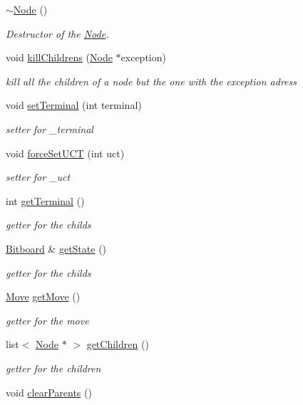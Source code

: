 \begin{DoxyCompactItemize}
\item 
\hyperlink{classmcts_1_1_node_acc91ea418dba8fa979b276e7d0a3af58}{$\sim$\+Node} ()
\begin{DoxyCompactList}\small\item\em Destructor of the \hyperlink{classmcts_1_1_node}{Node}. \end{DoxyCompactList}\item 
void \hyperlink{classmcts_1_1_node_ac01b59cb23a9cbbf0ccd710f42ac5c71}{kill\+Childrens} (\hyperlink{classmcts_1_1_node}{Node} $\ast$exception)
\begin{DoxyCompactList}\small\item\em kill all the children of a node but the one with the exception adress \end{DoxyCompactList}\item 
void \hyperlink{classmcts_1_1_node_acaeef5a74238b304834bacdba95ce46f}{set\+Terminal} (int terminal)
\begin{DoxyCompactList}\small\item\em setter for \+\_\+terminal \end{DoxyCompactList}\item 
void \hyperlink{classmcts_1_1_node_aa4e75d679f31d3f687342429892ab8ab}{force\+Set\+U\+C\+T} (int uct)
\begin{DoxyCompactList}\small\item\em setter for \+\_\+uct \end{DoxyCompactList}\item 
int \hyperlink{classmcts_1_1_node_abdae55b6017c6f223b63d2fa193c4420}{get\+Terminal} ()
\begin{DoxyCompactList}\small\item\em getter for the childs \end{DoxyCompactList}\item 
\hyperlink{class_bitboard}{Bitboard} \& \hyperlink{classmcts_1_1_node_af2170e0b8de1be9228666b8ef54681f8}{get\+State} ()
\begin{DoxyCompactList}\small\item\em getter for the childs \end{DoxyCompactList}\item 
\hyperlink{class_move}{Move} \hyperlink{classmcts_1_1_node_ad17cd9cf5c86f718aa99eb6597750d74}{get\+Move} ()
\begin{DoxyCompactList}\small\item\em getter for the move \end{DoxyCompactList}\item 
list$<$ \hyperlink{classmcts_1_1_node}{Node} $\ast$ $>$ \hyperlink{classmcts_1_1_node_a06fe80a95c5535f04c1f952b3e687d56}{get\+Children} ()
\begin{DoxyCompactList}\small\item\em getter for the children \end{DoxyCompactList}\item 
\hypertarget{classmcts_1_1_node_add60b79e66e67ae93a299d211f06f9c6}{void \hyperlink{classmcts_1_1_node_add60b79e66e67ae93a299d211f06f9c6}{clear\+Parents} ()}\label{classmcts_1_1_node_add60b79e66e67ae93a299d211f06f9c6}


\end{DoxyCompactItemize}
